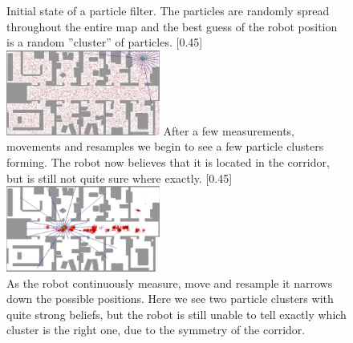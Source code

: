 
\begin{figure}[!b]
    \centering
    
        {Initial state of a particle filter. The particles are randomly spread throughout the entire map and the best guess of the robot position is a random ''cluster'' of particles. \label{subfig:demo1}}
        [0.45\textwidth]
        {\includegraphics[width=0.45\textwidth]{ParticleFilter/demo1.png}}
%
\hspace{0.02\textwidth} %
%
        {After a few measurements, movements and resamples we begin to see a few particle clusters forming. The robot now believes that it is located in the corridor, but is still not quite sure where exactly. \label{subfig:demo2}}
        [0.45\textwidth]
        {\includegraphics[width=0.45\textwidth]{ParticleFilter/demo3.png}}%
%
\\ %
%
        {As the robot continuously measure, move and resample it narrows down the possible positions. Here we see two particle clusters with quite strong beliefs, but the robot is still unable to tell exactly which cluster is the right one, due to the symmetry of the corridor.\label{subfig:demo3}}

\end{figure}
